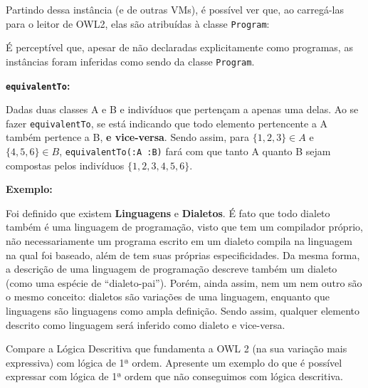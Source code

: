 \documentclass[answers]{exam}
\newcommand{\result}[2]{\textfile[firstline=#1, lastline=#2]{thesampleoutput}}
\begin{document}
\begin{questions}
\begin{answer}
            Partindo dessa instância (e de outras VMs), é possível ver que, ao
            carregá-las para o leitor de OWL2, elas são atribuídas à classe
            \texttt{Program}:

            \result{15}{17}

            É perceptível que, apesar de não declaradas explicitamente como
            programas, as instâncias foram inferidas como sendo da classe
            \texttt{Program}.

            \textbf{\texttt{equivalentTo}:}

            Dadas duas classes A e B e indivíduos que pertençam a apenas uma
            delas. Ao se fazer \texttt{equivalentTo}, se está indicando que
            todo elemento pertencente a A também pertence a B, \textbf{e
            vice-versa}.  Sendo assim, para $\{1, 2, 3\} \in A$ e $\{4, 5, 6\}
            \in B$, \texttt{equivalentTo(:A :B)} fará com que tanto A quanto B
            sejam compostas pelos indivíduos $\{1, 2, 3, 4, 5, 6\}$.

            \textbf{Exemplo:}

            Foi definido que existem \textbf{Linguagens} e \textbf{Dialetos}. É
            fato que todo dialeto também é uma linguagem de programação, visto
            que tem um compilador próprio, não necessariamente um programa
            escrito em um dialeto compila na linguagem na qual foi baseado,
            além de tem suas próprias especificidades. Da mesma forma, a
            descrição de uma linguagem de programação descreve também um
            dialeto (como uma espécie de ``dialeto-pai''). Porém, ainda assim,
            nem um nem outro são o mesmo conceito: dialetos são variações de
            uma linguagem, enquanto que linguagens são linguagens como ampla
            definição.  Sendo assim, qualquer elemento descrito como linguagem
            será inferido como dialeto e vice-versa.
        \end{answer}

        \question{}
        Compare a Lógica Descritiva que fundamenta a OWL 2 (na sua variação
        mais expressiva) com lógica de 1ª ordem. Apresente um exemplo do que é
        possível expressar com lógica de 1ª ordem que não conseguimos com
        lógica descritiva.

        \begin{answer}
        \end{answer}
    \end{questions}
\end{document}
